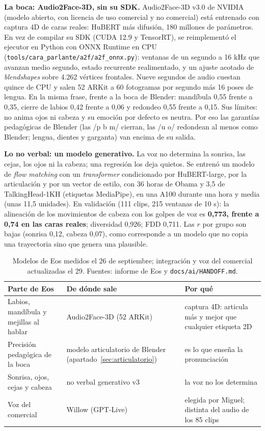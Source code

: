 \documentclass[11pt,a4paper]{article}
\newcommand{\cod}[1]{\texttt{\small #1}}
\begin{document}
\textbf{La boca: Audio2Face-3D, sin su SDK.} Audio2Face-3D v3.0 de NVIDIA (modelo abierto, con
licencia de uso comercial y no comercial) está entrenado con captura 4D de caras reales: HuBERT
más difusión, 180 millones de parámetros. En vez de compilar su SDK (CUDA 12.9 y TensorRT), se
reimplementó el ejecutor en Python con ONNX Runtime en CPU
(\cod{tools/cara\_parlante/\allowbreak a2f/a2f\_onnx.py}): ventanas de un segundo a 16 kHz que
avanzan medio segundo, estado recurrente realimentado, y un ajuste acotado de
\emph{blendshapes} sobre 4.262 vértices frontales. Nueve segundos de audio cuestan quince de CPU
y salen 52 ARKit a 60 fotogramas por segundo más 16 poses de lengua. En la misma frase, frente
a la boca de Blender: mandíbula 0,55 frente a 0,35, cierre de labios 0,42 frente a 0,06 y
redondeo 0,55 frente a 0,15. Sus límites: no anima ojos ni cabeza y su emoción por defecto es
neutra. Por eso las garantías pedagógicas de Blender (las /p b m/ cierran, las /u o/ redondean
al menos como Blender; lengua, dientes y garganta) van encima de su salida.

\textbf{Lo no verbal: un modelo generativo.} La voz no determina la sonrisa, las cejas, los ojos
ni la cabeza; una regresión los deja quietos. Se entrenó un modelo de \emph{flow matching} con
un \emph{transformer} condicionado por HuBERT-large, por la articulación y por un vector de
estilo, con 36 horas de Obama y 3,5 de TalkingHead-1KH (etiquetas MediaPipe), en una A100
durante una hora y media (unas 11,5 unidades). En validación (111 clips, 215 ventanas de 10 s):
la alineación de los movimientos de cabeza con los golpes de voz es \textbf{0,773, frente a
0,74 en las caras reales}; diversidad 0,926; FDD 0,711. Las $r$ por grupo son bajas (sonrisa
0,12, cabeza 0,07), como corresponde a un modelo que no copia una trayectoria sino que genera
una plausible.

\begin{table}[htbp]
\centering
\small
\begin{tabularx}{\textwidth}{@{}L{3.6cm} L{4.2cm} Y@{}}
\toprule
\textbf{Parte de Eos} & \textbf{De dónde sale} & \textbf{Por qué} \\
\midrule
Labios, mandíbula y mejillas al hablar & Audio2Face-3D (52 ARKit) & captura 4D: articula más y mejor que cualquier etiqueta 2D \\
Precisión pedagógica de la boca & modelo articulatorio de Blender (apartado~\ref{sec:articulatorio}) & es lo que enseña la pronunciación \\
Sonrisa, ojos, cejas y cabeza & no verbal generativo v3 & la voz no los determina \\
Voz del comercial & Willow (GPT-Live) & elegida por Miguel; distinta del audio de los 85 clips \\
\bottomrule
\end{tabularx}
\caption[Cómo queda Eos]{Modelos de Eos medidos el 26 de septiembre;
integración y voz del comercial actualizadas el 29. Fuentes: informe de Eos y
\cod{docs/ai/HANDOFF.md}.}
\label{tab:eos}
\end{table}
\end{document}
